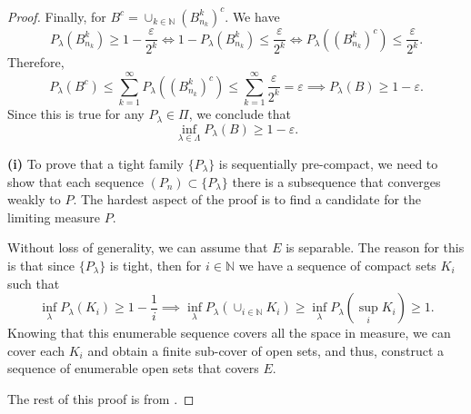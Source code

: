\begin{proof}
	Finally, for $B^c = \cup_{k \in \mathbb N} (B^k_{n_k})^c$. We have
	\begin{displaymath}
		P_\lambda(B^k_{n_k}) \geq 1-\frac{\varepsilon}{2^{k}} \iff
		1- P_\lambda(B^k_{n_k}) \leq \frac{\varepsilon}{2^{k}} \iff
		P_\lambda((B^k_{n_k})^c) \leq \frac{\varepsilon}{2^{k}}.
	\end{displaymath}
	Therefore,
	\begin{displaymath}
		P_\lambda(B^c) \leq \sum_{k=1}^\infty P_\lambda((B^k_{n_k})^c) \leq \sum_{k=1}^\infty \frac{\varepsilon}{2^k} = \varepsilon
		\implies P_\lambda(B) \geq 1 - \varepsilon.
	\end{displaymath}
	Since this is true for any $P_\lambda \in \Pi$, we conclude that
	\begin{displaymath}
		\inf_{\lambda \in \Lambda} P_\lambda(B) \geq 1 - \varepsilon.
	\end{displaymath}

	\vspace{3mm}
	\noindent
	\textbf{(i)} To prove that a tight family $\{P_\lambda\}$ is sequentially pre-compact, we need
  to show that each sequence $(P_n) \subset \{P_\lambda\}$ there is a subsequence that converges weakly to $P$.
  The hardest aspect of the proof is to find a candidate for the limiting measure $P$.

  Without loss of generality, we can assume that $E$ is separable. The reason for this is that
  since $\{P_\lambda\}$ is tight, then for $i \in \mathbb N$ we have a sequence of compact
  sets $K_i$ such that
  \begin{displaymath}
    \inf_\lambda P_\lambda(K_i) \geq 1 - \frac{1}{i} \implies
    \inf_\lambda P_\lambda(\cup_{i \in \mathbb N} K_i) \geq
    \inf_\lambda P_\lambda(\sup_{i} K_i) \geq 1.
  \end{displaymath}
  Knowing that this enumerable sequence covers all the space in measure, we can   
  cover each $K_i$ and obtain a finite sub-cover of open sets, and thus, construct a sequence
  of enumerable open sets that covers $E$.

  The rest of this proof is from \citet{chin2019new}.


\end{proof}


